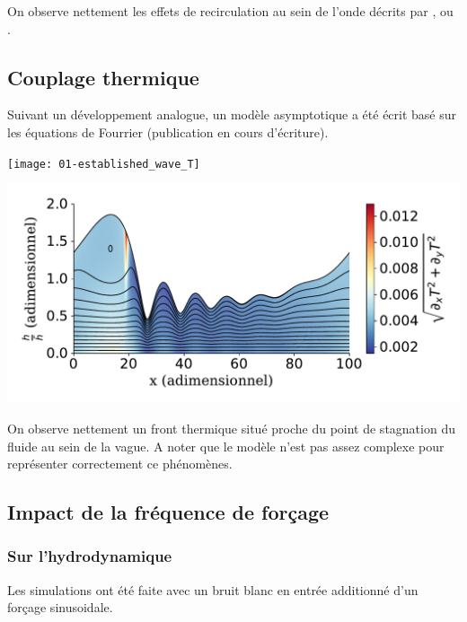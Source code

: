 \documentclass[a0,portrait]{a0poster}
\begin{document}
\begin{multicols}{2}
    On observe nettement les effets de recirculation au sein de l'onde décrits par \textcite{Brauner1989}, \textcite{Yoshimura1996} ou \textcite{Miyara1999}.

    \subsection*{Couplage thermique}
    Suivant un développement analogue, un modèle asymptotique a été écrit basé sur les équations de Fourrier (publication en cours d'écriture).

    \begin{multicols}{2}
        \begin{center}
            \texttt{[image: 01-established\_wave\_T]}
            \label{fig:thermal}
        \end{center}
        \columnbreak
        \begin{center}
            \includegraphics[width=0.98\columnwidth]{01-established_wave_Tmag_streamlines}
            \label{fig:streamlines_thermal}
        \end{center}
    \end{multicols}

    On observe nettement un front thermique situé proche du point de stagnation du fluide au sein de la vague. A noter que le modèle n'est pas assez complexe pour représenter correctement ce phénomènes.

    \subsection*{Impact de la fréquence de forçage}

    \begin{multicols}{2}
        \subsubsection*{Sur l'hydrodynamique}
        Les simulations ont été faite avec un bruit blanc en entrée additionné d'un forçage sinusoidale.


\end{multicols}
\end{multicols}
\end{document}
